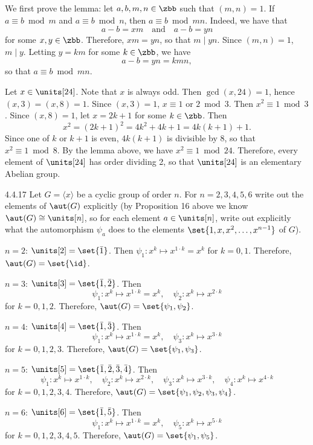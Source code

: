 \begin{sol}[spsol]
	We first prove the lemma: let $a, b, m, n \in \zbb$ such that $(m, n) = 1$.
	If $a \equiv b \bmod m$ and $a \equiv b \bmod n$, then $a \equiv b \bmod{mn}$.
	Indeed, we have that
	\[
		a - b = xm \quad \text{and} \quad a - b = yn
	\]
	for some $x, y \in \zbb$.
	Therefore, $xm = yn$, so that $m \mid yn$.
	Since $(m, n) = 1$, $m \mid y$.
	Letting $y = km$ for some $k \in \zbb$, we have
	\[
		a - b = yn = kmn,
	\]
	so that $a \equiv b \bmod{mn}$.

	Let $x \in \units[24]$.
	Note that $x$ is always odd.
	Then $\gcd(x, 24) = 1$, hence $(x, 3) = (x, 8) = 1$.
	Since $(x, 3) = 1$, $x \equiv 1$ or $2 \bmod 3$.
	Then $x^2 \equiv 1 \bmod 3$.
	Since $(x, 8) = 1$, let $x = 2k + 1$ for some $k \in \zbb$.
	Then
	\[
		x^2 = (2k + 1)^2 = 4k^2 + 4k + 1 = 4k(k + 1) + 1.
	\]
	Since one of $k$ or $k + 1$ is even, $4k(k + 1)$ is divisible by 8, so that $x^2 \equiv 1 \bmod 8$.
	By the lemma above, we have $x^2 \equiv 1 \bmod 24$.
	Therefore, every element of $\units[24]$ has order dividing 2, so that $\units[24]$ is an elementary Abelian group.
\end{sol}

\begin{exercise}{4.4.17}
	Let $G=\langle x\rangle$ be a cyclic group of order $n$.
	For $n=2,3,4,5,6$ write out the elements of $\aut(G)$ explicitly (by Proposition 16 above we know $\aut(G)\cong\units[n]$, so for each element $a\in\units[n]$, write out explicitly what the automorphism $\psi_a$ does to the elements $\set{1,x,x^2,\ldots,x^{n-1}}$ of $G$).
\end{exercise}

\begin{solitem}
	\item $n = 2$: $\units[2] = \set{\bar 1}$.
	Then $\psi_1 : x^k \mapsto x^{1 \cdot k} = x^k$ for $k = 0, 1$.
	Therefore, $\aut(G) = \set{\id}$.
	\item $n = 3$: $\units[3] = \set{\bar 1, \bar 2}$.
	Then
	\[
		\psi_1 : x^k \mapsto x^{1 \cdot k} = x^k, \quad \psi_2 : x^k \mapsto x^{2 \cdot k}
	\]
	for $k = 0, 1, 2$.
	Therefore, $\aut(G) = \set{\psi_1, \psi_2}$.
	\item $n = 4$: $\units[4] = \set{\bar 1, \bar 3}$.
	Then
	\[
		\psi_1 : x^k \mapsto x^{1 \cdot k} = x^k, \quad \psi_3 : x^k \mapsto x^{3 \cdot k}
	\]
	for $k = 0, 1, 2, 3$.
	Therefore, $\aut(G) = \set{\psi_1, \psi_3}$.
	\item $n = 5$: $\units[5] = \set{\bar 1, \bar 2, \bar 3, \bar 4}$.
	Then
	\[
		\psi_1 : x^k \mapsto x^{1 \cdot k}, \quad \psi_2 : x^k \mapsto x^{2 \cdot k}, \quad \psi_3 : x^k \mapsto x^{3 \cdot k}, \quad \psi_4 : x^k \mapsto x^{4 \cdot k}
	\]
	for $k = 0, 1, 2, 3, 4$.
	Therefore, $\aut(G) = \set{\psi_1, \psi_2, \psi_3, \psi_4}$.
	\item $n = 6$: $\units[6] = \set{\bar 1, \bar 5}$.
	Then
	\[
		\psi_1 : x^k \mapsto x^{1 \cdot k} = x^k, \quad \psi_5 : x^k \mapsto x^{5 \cdot k}
	\]
	for $k = 0, 1, 2, 3, 4, 5$.
	Therefore, $\aut(G) = \set{\psi_1, \psi_5}$.
\end{solitem}


